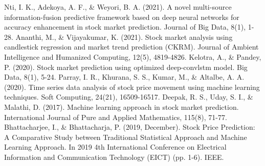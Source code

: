 \documentclass[conference]{IEEEtran}
\begin{document}
\begin{thebibliography}{00}
 Nti, I. K., Adekoya, A. F., \& Weyori, B. A. (2021). A novel multi-source information-fusion predictive framework based on deep neural networks for accuracy enhancement in stock market prediction. Journal of Big Data, 8(1), 1-28.
 Ananthi, M., \& Vijayakumar, K. (2021). Stock market analysis using candlestick regression and market trend prediction (CKRM). Journal of Ambient Intelligence and Humanized Computing, 12(5), 4819-4826.
 Kelotra, A., \& Pandey, P. (2020). Stock market prediction using optimized deep-convlstm model. Big Data, 8(1), 5-24.
 Parray, I. R., Khurana, S. S., Kumar, M., \& Altalbe, A. A. (2020). Time series data analysis of stock price movement using machine learning techniques. Soft Computing, 24(21), 16509-16517.
 Deepak, R. S., Uday, S. I., \& Malathi, D. (2017). Machine learning approach in stock market prediction. International Journal of Pure and Applied Mathematics, 115(8), 71-77. 
 Bhattacharjee, I., \& Bhattacharja, P. (2019, December). Stock Price Prediction: A Comparative Study between Traditional Statistical Approach and Machine Learning Approach. In 2019 4th International Conference on Electrical Information and Communication Technology (EICT) (pp. 1-6). IEEE.

\end{thebibliography}
\vspace{12pt}
\end{document}
